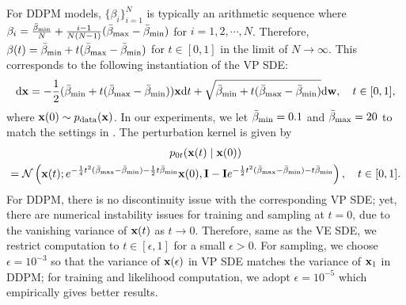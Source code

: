 For DDPM models, $\{\beta_i\}_{i=1}^N$ is typically an arithmetic sequence where $\beta_i = \frac{\bar{\beta}_{\text{min}}}{N} + \frac{i-1}{N(N-1)}(\bar{\beta}_{\text{max}} -\bar{\beta}_{\text{min}})$ for $i=1,2,\cdots, N$. Therefore, $\beta(t) = \bar{\beta}_{\text{min}} + t(\bar{\beta}_{\text{max}} - \bar{\beta}_{\text{min}})$ for $t\in[0,1]$ in the limit of $N \to \infty$. This corresponds to the following instantiation of the VP SDE:
\begin{gather}
\mathrm{d} \mathbf{x} = -\frac{1}{2}(\bar{\beta}_{\text{min}} + t(\bar{\beta}_{\text{max}} - \bar{\beta}_{\text{min}})) \mathbf{x} \mathrm{d} t + \sqrt{\bar{\beta}_{\text{min}} + t(\bar{\beta}_{\text{max}} - \bar{\beta}_{\text{min}})} \mathrm{d} \mathbf{w}, \quad t\in[0,1],
\end{gather}
where $\mathbf{x}(0) \sim p_\text{data}(\mathbf{x})$. In our experiments, we let $\bar{\beta}_{\text{min}} = 0.1$ and $\bar{\beta}_{\text{max}} = 20$ to match the settings in \citet{ho2020denoising}. The perturbation kernel is given by
\begin{multline}
    p_{0t}(\mathbf{x}(t) \mid \mathbf{x}(0)) \\
    = \mathcal{N}\left(\mathbf{x}(t) ; e^{-\frac{1}{4}t^2(\bar{\beta}_{\text{max}}-\bar{\beta}_{\text{min}}) - \frac{1}{2}t\bar{\beta}_{\text{min}}}\mathbf{x}(0), \mathbf{I} - \mathbf{I} e^{-\frac{1}{2}t^2(\bar{\beta}_{\text{max}} -\bar{\beta}_{\text{min}}) - t\bar{\beta}_{\text{min}}} \right), \quad t\in[0,1].
\end{multline}
For DDPM, there is no discontinuity issue with the corresponding VP SDE; yet, there are numerical instability issues for training and sampling at $t=0$, due to the vanishing variance of $\mathbf{x}(t)$ as $t \to 0$. Therefore, same as the VE SDE, we restrict computation to $t\in[\epsilon, 1]$ for a small $\epsilon > 0$. For sampling, we choose $\epsilon=10^{-3}$ so that the variance of $\mathbf{x}(\epsilon)$ in VP SDE matches the variance of $\mathbf{x}_1$ in DDPM; for training and likelihood computation, we adopt $\epsilon=10^{-5}$ which empirically gives better results.

